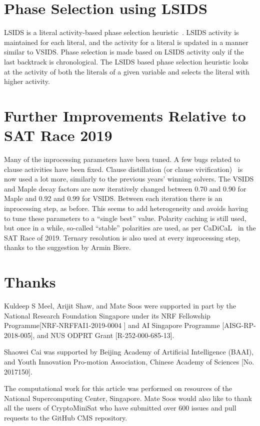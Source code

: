\documentclass[final]{ieee}
\begin{document}
\section{Phase Selection using LSIDS}
LSIDS is a literal activity-based phase selection heuristic~\cite{shaw2020designing}. LSIDS activity is maintained for each literal, and the activity for a literal is updated in a manner similar to VSIDS. Phase selection is made based on LSIDS activity only if the last backtrack is chronological. The LSIDS based phase selection heuristic looks at the activity of both the literals of a given variable and selects the literal with higher activity.


\section{Further Improvements Relative to SAT Race 2019}
Many of the inprocessing parameters have been tuned. A few bugs related to clause activities have been fixed. Clause distillation (or clause vivification)~\cite{DBLP:journals/ai/LiXLMLL20} is now used a lot more, similarly to the previous years' winning solvers. The VSIDS and Maple decay factors are now iteratively changed between 0.70 and 0.90 for Maple and 0.92 and 0.99 for VSIDS. Between each iteration there is an inprocessing step, as before. This seems to add heterogeneity and avoids having to tune these parameters to a ``single best'' value. Polarity caching is still used, but once in a while, so-called ``stable'' polarities are used, as per CaDiCaL~\cite{cadical} in the SAT Race of 2019. Ternary resolution is also used at every inprocessing step, thanks to the suggestion by Armin Biere.


\section{Thanks}
Kuldeep S Meel, Arijit Shaw, and Mate Soos were supported in part by the National Research Foundation Singapore under its NRF Fellowship Programme[NRF-NRFFAI1-2019-0004 ] and AI Singapore Programme [AISG-RP-2018-005],  and NUS ODPRT Grant [R-252-000-685-13].

Shaowei Cai was supported  by Beijing Academy of Artificial Intelligence (BAAI), and Youth Innovation Pro-motion Association, Chinese Academy of Sciences [No. 2017150].

The computational work for this article was performed on resources of the National Supercomputing Center, Singapore\cite{nscc}. Mate Soos would also like to thank all the users of CryptoMiniSat who have submitted over 600 issues and pull requests to the GitHub CMS repository\cite{CMS}.




\vfill
\pagebreak
\end{document}
